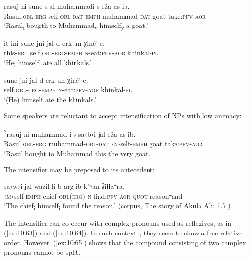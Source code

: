 ﻿\documentclass[output=paper]{langsci/langscibook}
\begin{document}
\ea \label{ex:10:58} %
\gll  rasuj-ni sune-s-al muħammadi-s eža as-ib.\\
Rasul.\textsc{obl}-\textsc{erg} self.\textsc{obl}-\textsc{dat}-\textsc{emph} muhammad-\textsc{dat} goat take:\textsc{pfv}-\textsc{aor}\\  
\glt `Rasul\textsubscript{i} bougth to Muhammad\textsubscript{y}
himself\textsubscript{y} a goat.'

\ex \label{ex:10:59} %
\gll  it-ini sune-jni-jal d-erk-un χinč'-e.\\
this-\textsc{erg} self.\textsc{obl}-\textsc{erg}-\textsc{emph} \textsc{n}-eat:\textsc{pfv}-\textsc{aor} khinkal-\textsc{pl}\\ 
\glt `He\textsubscript{i} himself\textsubscript{i} ate all khinkals.'

\ex \label{ex:10:60} %
\gll  sune-jni-jal d-erk-un χinč'-e.\\
self.\textsc{obl}-\textsc{erg}-\textsc{emph} \textsc{n}-eat:\textsc{pfv}-\textsc{aor} khinkal-\textsc{pl}\\
\glt `(He) himself ate the khinkals.'
\z

Some speakers are reluctant to accept intensification of NPs with low
animacy:

\ea %
\gll  \textsuperscript{?}rasuj-ni muħammad-i-s sa‹b›i-jal eža as-ib.\\
Rasul.\textsc{obl}-\textsc{erg} muhammad-\textsc{obl}-\textsc{dat} ‹\textsc{n}›self-\textsc{emph} goat take:\textsc{pfv}-\textsc{aor}\\ 
\glt `Rasul bought to Muhammad this the very goat.'
\z

The intensifier may be preposed to its antecedent:


\ea %
\gll  sa‹w›i-jal wazil-li b-arg-ib k'ʷan ʡilla꞊ra.\\
‹\textsc{m}›self-\textsc{emph} chief-\textsc{obl}(\textsc{erg}) \textsc{n}-find:\textsc{pfv}-\textsc{aor} \textsc{quot} reason꞊and\\
\glt `The chief\textsubscript{i} himself\textsubscript{i} found the reason.'
(corpus, The story of Akula Ali: 1.7 \citep{magometov1982})
\z

The intensifier can co-occur with complex pronouns used as reflexives,
as in (\ref{ex:10:63}) and (\ref{ex:10:64}). In such contexts, they seem to show a free relative
order. However, (\ref{ex:10:65}) shows that the compound consisting of two complex
pronouns cannot be split.
\end{document}
